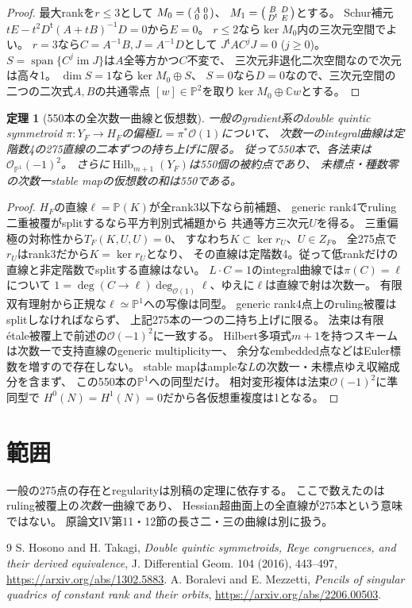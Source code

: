 \documentclass[11pt,a4paper]{ltjsarticle}
\newtheorem{theorem}{定理}[section]
\newcommand{\CC}{\mathbb C}
\newcommand{\PP}{\mathbb P}
\newcommand{\OO}{\mathcal O}
\newcommand{\Hilb}{\operatorname{Hilb}}
\begin{document}
\begin{proof}
最大rankを$r\le3$として
$M_0=\begin{psmallmatrix}A&0\\0&0\end{psmallmatrix}$、
$M_1=\begin{psmallmatrix}B&D\\D^{\mathsf t}&E\end{psmallmatrix}$とする。
Schur補元$tE-t^2D^{\mathsf t}(A+tB)^{-1}D=0$から$E=0$。
$r\le2$なら$\ker M_0$内の三次元空間でよい。
$r=3$なら$C=A^{-1}B,J=A^{-1}D$として
$J^{\mathsf t}AC^jJ=0$ ($j\ge0$)。
$S=\operatorname{span}\{C^j\operatorname{im}J\}$は$A$全等方かつ$C$不変で、
三次元非退化二次空間なので次元は高々1。
$\dim S=1$なら$\ker M_0\oplus S$、
$S=0$なら$D=0$なので、三次元空間の二つの二次式$A,B$の共通零点
$[w]\in\PP^2$を取り$\ker M_0\oplus\CC w$とする。
\end{proof}
\begin{theorem}[550本の全次数一曲線と仮想数]
一般のgradient系のdouble quintic symmetroid
$\pi:Y_F\to H_F$の偏極$L=\pi^*\OO(1)$について、
次数一のintegral曲線は定階数4の275直線の二本ずつの持ち上げに限る。
従って550本で、各法束は$\OO_{\PP^1}(-1)^2$。
さらに$\Hilb_{m+1}(Y_F)$は550個の被約点であり、
未標点・種数零の次数一stable mapの仮想数の和は550である。
\end{theorem}
\begin{proof}
$H_F$の直線$\ell=\PP(K)$が全rank3以下なら前補題、
generic rank4でruling二重被覆がsplitするなら平方判別式補題から
共通等方三次元$U$を得る。
三重偏極の対称性から$T_F(K,U,U)=0$、
すなわち$K\subset\ker r_U$、$U\in Z_F$。
全275点で$r_U$はrank3だから$K=\ker r_U$となり、
その直線は定階数4。従って低rankだけの直線と非定階数でsplitする直線はない。
$L\cdot C=1$のintegral曲線では$\pi(C)=\ell$について
$1=\deg(C\to\ell)\deg_{\OO(1)}\ell$、ゆえに$\ell$は直線で射は次数一。
有限双有理射から正規な$\ell\simeq\PP^1$への写像は同型。
generic rank4点上のruling被覆はsplitしなければならず、
上記275本の一つの二持ち上げに限る。
法束は有限étale被覆上で前述の$\OO(-1)^2$に一致する。
Hilbert多項式$m+1$を持つスキームは次数一で支持直線のgeneric multiplicity一、
余分なembedded点などはEuler標数を増すので存在しない。
stable mapはampleな$L$の次数一・未標点ゆえ収縮成分を含まず、
この550本の$\PP^1$への同型だけ。
相対変形複体は法束$\OO(-1)^2$に準同型で
$H^0(N)=H^1(N)=0$だから各仮想重複度は1となる。
\end{proof}
\section{範囲}
一般の275点の存在とregularityは別稿の定理に依存する。
ここで数えたのはruling被覆上の\emph{次数一}曲線であり、
Hessian超曲面上の全直線が275本という意味ではない。
原論文IV第11・12節の長さ二・三の曲線は別に扱う。
\begin{thebibliography}{9}
 S. Hosono and H. Takagi,
\emph{Double quintic symmetroids, Reye congruences, and their derived equivalence},
J. Differential Geom. 104 (2016), 443--497, \url{https://arxiv.org/abs/1302.5883}.
 A. Boralevi and E. Mezzetti,
\emph{Pencils of singular quadrics of constant rank and their orbits},
\url{https://arxiv.org/abs/2206.00503}.
\end{thebibliography}
\end{document}
